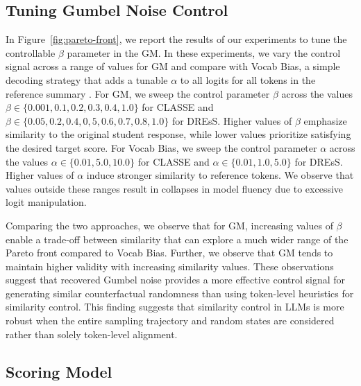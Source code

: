 \documentclass[11pt]{article}
\begin{document}
\subsection{Tuning Gumbel Noise Control} \label{apx:tuning}

In Figure~\ref{fig:pareto-front}, we report the results of our experiments to tune the controllable $\beta$ parameter in the GM. In these experiments, we vary the control signal across a range of values for GM and compare with Vocab Bias, a simple decoding strategy that adds a tunable $\alpha$ to all logits for all tokens in the reference summary \cite{yang_fudge_2021}. For GM, we sweep the control parameter $\beta$ across the values $\beta \in \{0.001, 0.1, 0.2, 0.3, 0.4, 1.0\}$ for CLASSE and $\beta \in \{0.05, 0.2, 0.4, 0,5, 0.6, 0.7, 0.8, 1.0\}$ for DREsS. Higher values of $\beta$ emphasize similarity to the original student response, while lower values prioritize satisfying the desired target score. For Vocab Bias, we sweep the control parameter $\alpha$ across the values $\alpha \in \{0.01, 5.0, 10.0\}$ for CLASSE and $\alpha \in \{0.01, 1.0, 5.0\}$ for DREsS. Higher values of $\alpha$ induce stronger similarity to reference tokens. We observe that values outside these ranges result in collapses in model fluency due to excessive logit manipulation.

Comparing the two approaches, we observe that for GM, increasing values of $\beta$ enable a trade-off between similarity that can explore a much wider range of the Pareto front compared to Vocab Bias. Further, we observe that GM tends to maintain higher validity with increasing similarity values. These observations suggest that recovered Gumbel noise provides a more effective control signal for generating similar counterfactual randomness than using token-level heuristics for similarity control. This finding suggests that similarity control in LLMs is more robust when the entire sampling trajectory and random states are considered rather than solely token-level alignment.

\subsection{Scoring Model} \label{apx:scoring}
\end{document}
